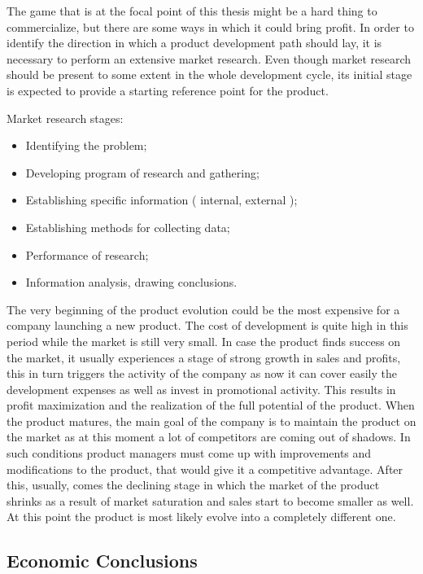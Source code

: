 The game that is at the focal point of this thesis might be a hard thing to
commercialize, but there are some ways in which it could bring profit. In
order to identify the direction in which a product development path should
lay, it is necessary to perform an extensive market research. Even though
market research should be present to some extent in the whole development
cycle, its initial stage is expected to provide a starting reference point for
the product.

Market research stages:
\begin{itemize}
    \item Identifying the problem;
    \item Developing program of research and gathering;
    \item Establishing specific information ( internal, external );
    \item Establishing methods for collecting data;
    \item Performance of research;
    \item Information analysis, drawing conclusions.
\end{itemize}

The very beginning of the product evolution could be the most expensive for a
company launching a new product. The cost of development is quite high in this
period while the market is still very small. In case the product finds success
on the market, it usually experiences a stage of strong growth in sales and
profits, this in turn triggers the activity of the company as now it can cover
easily the development expenses as well as invest in promotional activity.
This results in profit maximization and the realization of the full potential
of the product. When the product matures, the main goal of the company is to
maintain the product on the market as at this moment a lot of competitors are
coming out of shadows. In such conditions product managers must come up with
improvements and modifications to the product, that would give it a
competitive advantage. After this, usually, comes the declining stage in which
the market of the product shrinks as a result of market saturation and sales
start to become smaller as well. At this point the product is most likely
evolve into a completely different one.


\subsection{Economic Conclusions}

